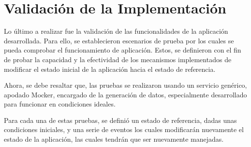 \section{Validación de la Implementación} \label{sec:experimental}

Lo último a realizar fue la validación de las funcionalidades de la aplicación desarrollada. Para ello, se establecieron escenarios de prueba por los cuales se pueda comprobar el funcionamiento de aplicación. Estos, se definieron con el fin de probar la capacidad y la efectividad de los mecanismos implementados de modificar el estado inicial de la aplicación hacia el estado de referencia.

Ahora, se debe resaltar que, las pruebas se realizaron usando un servicio genérico, apodado Mocker, encargado de la generación de datos, especialmente desarrollado para funcionar en condiciones ideales. 

Para cada una de estas pruebas, se definió un estado de referencia, dadas unas condiciones iniciales, y una serie de eventos los cuales modificarán nuevamente el estado de la aplicación, las cuales tendrán que ser nuevamente manejadas.




